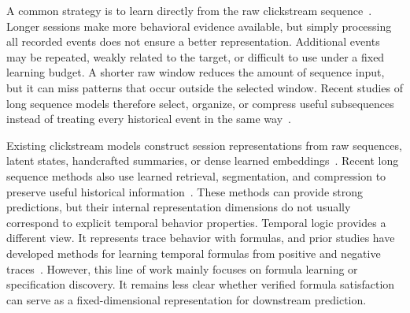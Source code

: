 \documentclass[sigconf,anonymous,nonacm]{acmart}
\begin{document}
A common strategy is to learn directly from the raw clickstream sequence~\cite{requena2020shopper,black2024trace}. Longer sessions make more behavioral evidence available, but simply processing all recorded events does not ensure a better representation. Additional events may be repeated, weakly related to the target, or difficult to use under a fixed learning budget. A shorter raw window reduces the amount of sequence input, but it can miss patterns that occur outside the selected window. Recent studies of long sequence models therefore select, organize, or compress useful subsequences instead of treating every historical event in the same way~\cite{li2026lifelong,lin2026mixture}.

Existing clickstream models construct session representations from raw sequences, latent states, handcrafted summaries, or dense learned embeddings~\cite{requena2020shopper,hatt2020early,ozyurt2022deep,black2024trace}.
Recent long sequence methods also use learned retrieval, segmentation, and compression to preserve useful historical information~\cite{li2026lifelong,lin2026mixture}. These methods can provide strong predictions, but their internal representation dimensions do not usually correspond to explicit temporal behavior properties. Temporal logic provides a different view. It represents trace behavior with formulas, and prior studies have developed methods for learning temporal formulas from positive and negative traces~\cite{camacho2019learning,wan2024end}. However, this line of work mainly focuses on formula learning or specification discovery. It remains less clear whether verified formula satisfaction can serve as a fixed-dimensional representation for downstream prediction.
\end{document}
